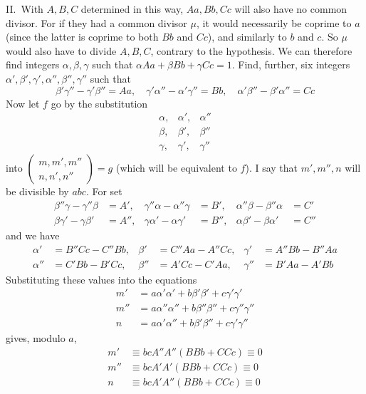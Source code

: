 II.\ With \(A,B,C\) determined in this way, \(Aa,Bb,Cc\) will also have
no common divisor. For if they had a common divisor \(\mu\), it
would necessarily be coprime to \(a\) (since the latter is coprime
to both \(Bb\) and \(Cc\)), and similarly to
\(b\) and \(c\). So \(\mu\) would also have to divide \(A,B,C\),
contrary to the hypothesis. We can therefore find integers \(\alpha,\beta,\gamma\)
such that \(\alpha Aa+\beta Bb+\gamma Cc=1\). Find, further, six integers \(\alpha',\beta',\gamma',\alpha'',\beta'',\gamma''\) such that
\[
\beta'\gamma''-\gamma'\beta''=Aa,\quad
\gamma'\alpha''-\alpha'\gamma''=Bb,\quad
\alpha'\beta''-\beta'\alpha''=Cc
\]
Now let \(f\) go by the substitution
\[
\begin{array}{ccc}
\alpha,&\alpha',&\alpha''\\
\beta,&\beta',&\beta''\\
\gamma,&\gamma',&\gamma''
\end{array}
\]
into \(\left(\begin{smallmatrix}m,m',m''\\n,n',n''\end{smallmatrix}\right)=g\) (which will be equivalent to \(f\)). I say that
\(m',m'',n\) will be divisible by \(abc\). For set
\[
\begin{aligned}
\beta''\gamma-\gamma''\beta&=A',&\gamma''\alpha-\alpha''\gamma&=B',&\alpha''\beta-\beta''\alpha&=C'\\
\beta\gamma'-\gamma\beta'&=A'',&\gamma\alpha'-\alpha\gamma'&=B'',&\alpha\beta'-\beta\alpha'&=C''
\end{aligned}
\]
and we have
\[
\begin{aligned}
\alpha'&=B''Cc-C''Bb,&\beta'&=C''Aa-A''Cc,&\gamma'&=A''Bb-B''Aa\\
\alpha''&=C'Bb-B'Cc,&\beta''&=A'Cc-C'Aa,&\gamma''&=B'Aa-A'Bb
\end{aligned}
\]
Substituting these values into the equations
\[
\begin{aligned}
m'&=a\alpha'\alpha'+b\beta'\beta'+c\gamma'\gamma'\\
m''&=a\alpha''\alpha''+b\beta''\beta''+c\gamma''\gamma''\\
n&=a\alpha'\alpha''+b\beta'\beta''+c\gamma'\gamma''
\end{aligned}
\]
gives, modulo \(a\),
\[
\begin{aligned}
m'&\equiv bcA''A''(BBb+CCc)\equiv0\\
m''&\equiv bcA'A'(BBb+CCc)\equiv0\\
n&\equiv bcA'A''(BBb+CCc)\equiv0
\end{aligned}
\]
